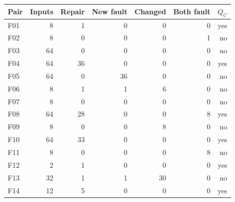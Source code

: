 \begin{tabular}{lrrrrrr}
\toprule
Pair & Inputs & Repair & New fault & Changed & Both fault & $Q_C$ \\
\midrule
F01 & 8 & 1 & 0 & 0 & 0 & yes \\
F02 & 8 & 0 & 0 & 0 & 1 & no \\
F03 & 64 & 0 & 0 & 0 & 0 & no \\
F04 & 64 & 36 & 0 & 0 & 0 & yes \\
F05 & 64 & 0 & 36 & 0 & 0 & no \\
F06 & 8 & 1 & 1 & 6 & 0 & no \\
F07 & 8 & 0 & 0 & 0 & 0 & no \\
F08 & 64 & 28 & 0 & 0 & 8 & yes \\
F09 & 8 & 0 & 0 & 8 & 0 & no \\
F10 & 64 & 33 & 0 & 0 & 0 & yes \\
F11 & 8 & 0 & 0 & 0 & 8 & no \\
F12 & 2 & 1 & 0 & 0 & 0 & yes \\
F13 & 32 & 1 & 1 & 30 & 0 & no \\
F14 & 12 & 5 & 0 & 0 & 0 & yes \\
\bottomrule
\end{tabular}

